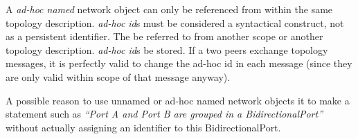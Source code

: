 A \emph{ad-hoc named} network object can only be referenced from within the same topology description. \emph{ad-hoc} \emph{id}s must be considered a syntactical construct, not as a persistent identifier. The \MUSTNOT{} be referred to from another scope or another topology description. \emph{ad-hoc id}s \SHOULDNOT{} be stored. If a two peers exchange topology messages, it is perfectly valid to change the ad-hoc id in each message (since they are only valid within scope of that message anyway).

A possible reason to use unnamed or ad-hoc named network objects it to make a statement such as \textit{“Port A and Port B are grouped in a BidirectionalPort”} without actually assigning an identifier to this BidirectionalPort.



